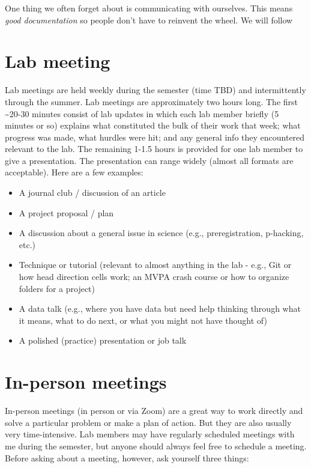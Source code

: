 \documentclass[
  12pt,
]{book}
\begin{document}
One thing we often forget about is communicating with ourselves. This means \emph{good documentation} so people don't have to reinvent the wheel. We will follow

\hypertarget{lab-meeting}{%
\section{Lab meeting}\label{lab-meeting}}

Lab meetings are held weekly during the semester (time TBD) and intermittently through the summer. Lab meetings are approximately two hours long. The first \textasciitilde20-30 minutes consist of lab updates in which each lab member briefly (5 minutes or so) explains what constituted the bulk of their work that week; what progress was made, what hurdles were hit; and any general info they encountered relevant to the lab. The remaining 1-1.5 hours is provided for one lab member to give a presentation. The presentation can range widely (almost all formats are acceptable). Here are a few examples:

\begin{itemize}
\item
  A journal club / discussion of an article
\item
  A project proposal / plan
\item
  A discussion about a general issue in science (e.g., preregistration, p-hacking, etc.)
\item
  Technique or tutorial (relevant to almost anything in the lab - e.g., Git or how head direction cells work; an MVPA crash course or how to organize folders for a project)
\item
  A data talk (e.g., where you have data but need help thinking through what it means, what to do next, or what you might not have thought of)
\item
  A polished (practice) presentation or job talk
\end{itemize}

\hypertarget{in-person-meetings}{%
\section{In-person meetings}\label{in-person-meetings}}

In-person meetings (in person or via Zoom) are a great way to work directly and solve a particular problem or make a plan of action. But they are also usually very time-intensive. Lab members may have regularly scheduled meetings with me during the semester, but anyone should always feel free to schedule a meeting. Before asking about a meeting, however, ask yourself three things:
\end{document}
